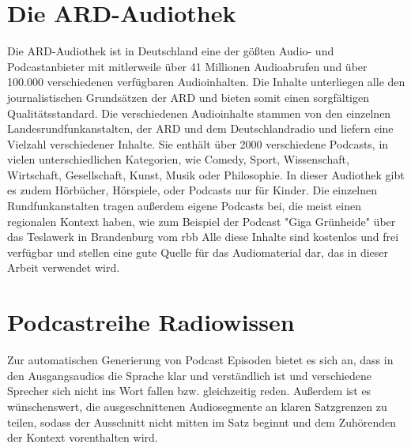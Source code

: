 


\section{Die ARD-Audiothek}

Die ARD-Audiothek ist in Deutschland eine der gößten Audio- und Podcastanbieter mit mitlerweile über 41 Millionen Audioabrufen und über 100.000 verschiedenen verfügbaren Audioinhalten. 
Die Inhalte unterliegen alle den journalistischen Grundsätzen der ARD und bieten somit einen sorgfältigen Qualitätsstandard. 
Die verschiedenen Audioinhalte stammen von den einzelnen Landesrundfunkanstalten, der ARD und dem Deutschlandradio und liefern eine Vielzahl verschiedener Inhalte.
Sie enthält über 2000 verschiedene Podcasts, in vielen unterschiedlichen Kategorien, wie Comedy, Sport, Wissenschaft, Wirtschaft, Gesellschaft, Kunst, Musik oder Philosophie. 
In dieser Audiothek gibt es zudem Hörbücher, Hörspiele, oder Podcasts nur für Kinder.
Die einzelnen Rundfunkanstalten tragen außerdem eigene Podcasts bei, die meist einen regionalen Kontext haben, wie zum Beispiel der Podcast "Giga Grünheide" über das Teslawerk in Brandenburg vom rbb
Alle diese Inhalte sind kostenlos und frei verfügbar und stellen eine gute Quelle für das Audiomaterial dar, das in dieser Arbeit verwendet wird.








\section{Podcastreihe Radiowissen}

Zur automatischen Generierung von Podcast Episoden bietet es sich an, dass in den Ausgangsaudios die Sprache klar und verständlich ist und verschiedene Sprecher sich nicht ins Wort fallen bzw. gleichzeitig reden.
Außerdem ist es wünschenswert, die ausgeschnittenen Audiosegmente an klaren Satzgrenzen zu teilen, sodass der Ausschnitt nicht mitten im Satz beginnt und dem Zuhörenden der Kontext vorenthalten wird. 

